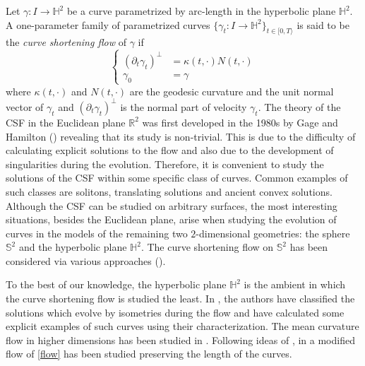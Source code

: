 \documentclass[12pt]{amsart}
\theoremstyle{plain}
\theoremstyle{definition}
\def\h{\mathbb H}
\def\r{\mathbb R}
\begin{document}
 Let $\gamma\colon I\to\h^2$ be a curve parametrized by arc-length in the hyperbolic plane $\h^2$.   A one-parameter family  of parametrized curves $\{\gamma_t\colon I\to\h^2\}_{t\in [0, T\rangle}$ is said to be the \textit{curve shortening flow} of $\gamma$ if 
 \begin{equation}\label{flow}
 \left\{
 \begin{split}
  \left(\partial_t \gamma_t\right)^\perp&= \kappa(t, \cdot) N(t, \cdot) \\ 
 \gamma_0&=\gamma   \end{split}\right.
\end{equation}
 where    $\kappa(t,\cdot)$ and $N(t,\cdot)$ are the geodesic curvature and the unit normal vector of $\gamma_t$ and $ \left(\partial_t \gamma_t\right)^\perp$ is the normal part of velocity $  \gamma_t$. The theory of the CSF in the Euclidean plane $\r^2$ was first developed in the 1980s by Gage and Hamilton (\cite{gh,ga}) revealing that its  study is non-trivial. This is due to    the difficulty of calculating explicit solutions to the flow and also due to the development of singularities during the evolution. Therefore, it is convenient to study the solutions of the CSF within some specific class of curves. Common examples of such classes are solitons, translating solutions and ancient convex solutions. Although the CSF can be studied on arbitrary surfaces, the most interesting situations, besides the Euclidean plane, arise when studying the evolution of curves in the models of the remaining two $2$-dimensional geometries: the  sphere $\mathbb{S}^2$ and the hyperbolic plane $\h^2.$ The curve shortening flow on $\mathbb{S}^2$ has been considered via various approaches (\cite{blz,bl}). 
 
 To the best of our knowledge, the hyperbolic plane $\h^2$ is the ambient in which the curve shortening flow is studied the least. In  \cite{dt,wx},   the authors have classified the solutions which evolve by isometries during the flow and have calculated some explicit examples of such curves using their characterization.   The mean curvature flow in higher dimensions has been   studied in    \cite{an,cm1,cm2}. Following ideas of  \cite{cm1}, in \cite{wy} a modified flow of \eqref{flow} has been studied preserving the length of the curves. 

 
 
\end{document}
